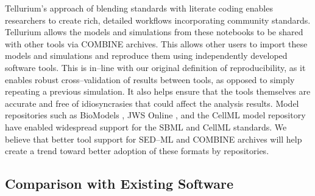 \documentclass[10pt,letterpaper]{article}
\begin{document}
Tellurium's approach of blending standards with literate coding enables researchers to create rich, detailed workflows incorporating community standards. Tellurium allows the models and simulations from these notebooks to be shared with other tools via COMBINE archives. This allows other users to import these models and simulations and reproduce them using independently developed software tools. This is in--line with our original definition of reproducibility, as it enables robust cross--validation of results between tools, as opposed to simply repeating a previous simulation. It also helps ensure that the tools themselves are accurate and free of idiosyncrasies that could affect the analysis results. Model repositories such as BioModels \cite{le2006biomodels,li2010biomodels}, JWS Online \cite{olivier2004web}, and the CellML model repository \cite{lloyd2008cellml} have enabled widespread support for the SBML and CellML standards. We believe that better tool support for SED--ML and COMBINE archives will help create a trend toward better adoption of these formats by repositories. %

\subsection*{Comparison with Existing Software}
\end{document}
